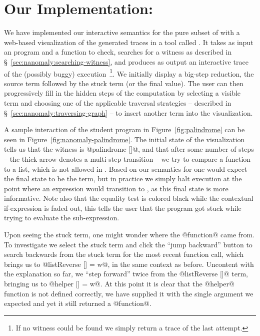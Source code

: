 \section{Our Implementation: \nanomaly}
\label{sec:nanomaly:impl-nanomaly}
We have implemented our interactive semantics for the pure subset of
\ocaml with a web-based visualization of the generated traces in a tool
called \nanomaly.
%
It takes as input an \ocaml program and a function to check, searches
for a witness as described in \S~\ref{sec:nanomaly:searching-witness}, and
produces as output an interactive trace of the (possibly buggy)
execution~\footnote{If no witness could be found we simply return a trace
  of the last attempt.}.
%
We initially display a big-step reduction, \ie the source term followed
by the stuck term (or the final value).
%
The user can then progressively fill in the hidden steps of the
computation by selecting a visible term and choosing one of the
applicable traversal strategies -- described in
\S~\ref{sec:nanomaly:traversing-graph} -- to insert another term into the
visualization.

A sample interaction of the student program in
Figure~\ref{fig:palindrome} can be seen in
Figure~\ref{fig:nanomaly-palindrome}.
%
The initial state of the visualization tells us that the witness is
@palindrome []@, and that after some number of steps -- the thick arrow
denotes a multi-step transition -- we try to compare a function to a
list, which is not allowed in \ocaml.
%
Based on our semantics for \lang one would expect the final state to be
the \stuck term, but in practice we simply halt execution at the point
where an expression would transition to \stuck, as this final state is
more informative.
%
Note also that the equality test is colored black while the contextual
if-expression is faded out, this tells the user that the program got
stuck while trying to evaluate the sub-expression.

Upon seeing the stuck term, one might wonder where the @function@
came from.
%
To investigate we select the stuck term and click the ``jump backward''
button to search backwards from the stuck term for the most recent
function call, which brings us to @listReverse [] = w@, in the same
context as before.
%
Uncontent with the explanation so far, we ``step forward'' twice from
the @listReverse []@ term, bringing us to @helper [] = w@.
%
At this point it is clear that the @helper@ function is not defined
correctly, we have supplied it with the single argument we expected and
yet it still returned a @function@.

